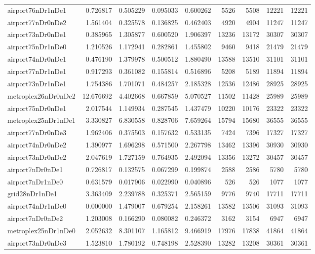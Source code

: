 \begin{longtable}{|l|r|r|r|r|r|r|r|r|}
airport76nDr1nDe1 & 0.726817 & 0.505229 & 0.095033 & 0.600262 & 5526 & 5508 & 12221 & 12221 \\
airport77nDr0nDe2 & 1.561404 & 0.325578 & 0.136825 & 0.462403 & 4920 & 4904 & 11247 & 11247 \\
airport73nDr0nDe1 & 0.385965 & 1.305877 & 0.600520 & 1.906397 & 13236 & 13172 & 30307 & 30307 \\
airport75nDr1nDe0 & 1.210526 & 1.172941 & 0.282861 & 1.455802 & 9460 & 9418 & 21479 & 21479 \\
airport74nDr0nDe1 & 0.476190 & 1.379978 & 0.500512 & 1.880490 & 13588 & 13510 & 31101 & 31101 \\
airport77nDr1nDe1 & 0.917293 & 0.361082 & 0.155814 & 0.516896 & 5208 & 5189 & 11894 & 11894 \\
airport73nDr1nDe1 & 1.754386 & 1.701071 & 0.484257 & 2.185328 & 12536 & 12486 & 28925 & 28925 \\
metroplex26nDr0nDe2 & 12.676692 & 4.402668 & 0.667859 & 5.070527 & 11502 & 11428 & 25989 & 25989 \\
airport75nDr0nDe1 & 2.017544 & 1.149934 & 0.287545 & 1.437479 & 10220 & 10176 & 23322 & 23322 \\
metroplex25nDr1nDe1 & 3.330827 & 6.830558 & 0.828706 & 7.659264 & 15794 & 15680 & 36555 & 36555 \\
airport77nDr0nDe3 & 1.962406 & 0.375503 & 0.157632 & 0.533135 & 7424 & 7396 & 17327 & 17327 \\
airport74nDr0nDe2 & 1.390977 & 1.696298 & 0.571500 & 2.267798 & 13462 & 13396 & 30930 & 30930 \\
airport73nDr0nDe2 & 2.047619 & 1.727159 & 0.764935 & 2.492094 & 13356 & 13272 & 30457 & 30457 \\
airport7nDr0nDe1 & 0.726817 & 0.132575 & 0.067299 & 0.199874 & 2588 & 2586 & 5780 & 5780 \\
airport7nDr1nDe0 & 0.631579 & 0.017906 & 0.022990 & 0.040896 & 526 & 526 & 1077 & 1077 \\
grid28nDr1nDe1 & 3.363409 & 2.239788 & 0.325371 & 2.565159 & 9776 & 9740 & 17711 & 17711 \\
airport74nDr1nDe0 & 0.000000 & 1.479007 & 0.679254 & 2.158261 & 13582 & 13506 & 31093 & 31093 \\
airport7nDr0nDe2 & 1.203008 & 0.166290 & 0.080082 & 0.246372 & 3162 & 3154 & 6947 & 6947 \\
metroplex25nDr1nDe0 & 2.052632 & 8.301107 & 1.165812 & 9.466919 & 17976 & 17838 & 41864 & 41864 \\
airport73nDr0nDe3 & 1.523810 & 1.780192 & 0.748198 & 2.528390 & 13282 & 13208 & 30361 & 30361 \\

\end{longtable}
